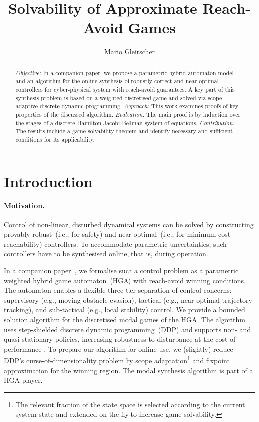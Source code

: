 \documentclass{article}
\begin{document}
\title{Solvability of Approximate Reach-Avoid Games}
\author{Mario Gleirscher}
\maketitle
\label{l:1}

\begin{abstract}
  \emph{Objective:} In a companion paper, we propose a parametric
  hybrid automaton model and an algorithm for the online synthesis of
  robustly correct and near-optimal controllers for
  cyber-physical system 
  with reach-avoid guarantees. 
  A key part of this synthesis problem is based on a weighted
  discretised 
  game 
  and solved via scope-adaptive discrete dynamic programming.
  \emph{Approach:} This work examines proofs of key properties of the
  discussed algorithm.
  \emph{Evaluation:} The main proof is by induction over the stages of
  a discrete Hamilton-Jacobi-Bellman system of equations.
  \emph{Contribution:} The results include a game solvability theorem
  and identify necessary and sufficient conditions for its
  applicability.
\end{abstract}

\section{Introduction}

 
\paragraph{Motivation.}

Control of non-linear, disturbed dynamical systems can be solved by
constructing provably robust~(i.e., for safety) and
near-optimal~(i.e., for minimum-cost reachability)
controllers.  To accommodate parametric uncertainties, such
controllers have to be synthesised online, that is, during operation.

In a companion paper~\cite{Gleirscher2025-ParametricModelOptimal},
we formalise such a control problem as a parametric weighted hybrid game automaton~(HGA)
with reach-avoid winning conditions.  The automaton enables a flexible
three-tier separation of control concerns: supervisory (e.g., moving
obstacle evasion), tactical (e.g., near-optimal trajectory tracking),
and sub-tactical 
(e.g., local stability) control.
We provide a bounded solution algorithm for the discretised modal
games of the HGA.  The algorithm uses step-shielded discrete dynamic programming~(DDP) and
supports non- and quasi-stationary policies, increasing robustness to
disturbance 
at the cost of performance 
\cite{Lewis2012-ReinforcementLearningFeedback}.  
To prepare our algorithm for online use, we (slightly) reduce DDP's
curse-of-dimensionality problem by scope adaptation\footnote{The
  relevant fraction of the state space is selected according to the
  current system state and extended on-the-fly to increase game
  solvability.}  and fixpoint approximation for the winning region.
The modal synthesis algorithm is part of a HGA player.
\end{document}
